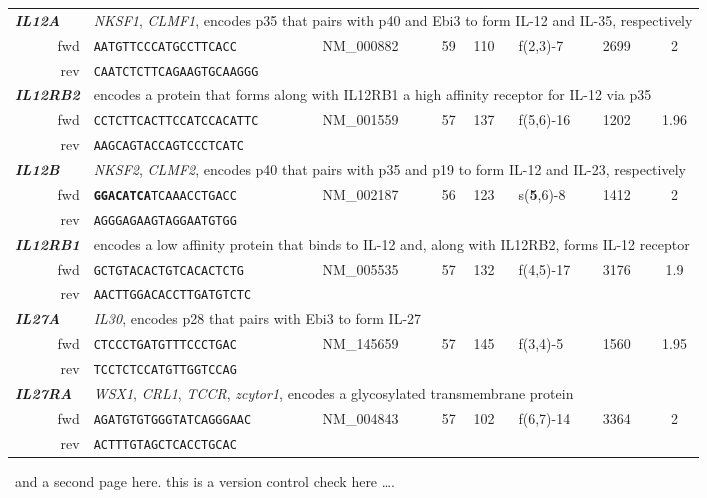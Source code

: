 \documentclass[12pt]{scrreprt} %
\begin{document}
\begin{table}[htbp]
{\begin{tabular}{rllclllc}
\hline \multicolumn{1}{l}{\textit{\textbf{IL12A}}} & \multicolumn{7}{l}{\textit{NKSF1}, \textit{CLMF1}, encodes p35 that pairs with p40 and Ebi3 to form IL-12 and IL-35, respectively} \\ 
\ fwd & \texttt{AATGTTCCCATGCCTTCACC} & NM\_000882 & 59 & 110 & f(2,3)-7 & 2699 & 2 \\ 
\ rev & \texttt{CAATCTCTTCAGAAGTGCAAGGG} &  &  &  &  &  &  \\ 
\hline \multicolumn{1}{l}{\textit{\textbf{IL12RB2}}} & \multicolumn{7}{l}{encodes a protein that forms along with IL12RB1 a high affinity receptor for IL-12 via p35} \\ 
\ fwd & \texttt{CCTCTTCACTTCCATCCACATTC} & NM\_001559 & 57 & 137 & f(5,6)-16 & 1202 & 1.96 \\ 
\ rev & \texttt{AAGCAGTACCAGTCCCTCATC} &  &  &  &  &  &  \\ 
\hline \multicolumn{1}{l}{\textit{\textbf{IL12B}}} & \multicolumn{7}{l}{\textit{NKSF2}, \textit{CLMF2}, encodes p40 that pairs with p35 and p19 to form IL-12 and IL-23, respectively} \\ 
\ fwd & \texttt{\textbf{GGACATCA}TCAAACCTGACC} & NM\_002187 & 56 & 123 & s(\textbf{5},6)-8 & 1412 & 2 \\ 
\ rev & \texttt{AGGGAGAAGTAGGAATGTGG} &  &  &  &  &  &  \\ 
\hline \multicolumn{1}{l}{\textit{\textbf{IL12RB1}}} & \multicolumn{7}{l}{encodes a low affinity protein that binds to IL-12 and, along with IL12RB2, forms IL-12 receptor} \\ 
\ fwd & \texttt{GCTGTACACTGTCACACTCTG} & NM\_005535 & 57 & 132 & f(4,5)-17 & 3176 & 1.9 \\ 
\ rev & \texttt{AACTTGGACACCTTGATGTCTC} &  &  &  &  &  &  \\ 
\hline \multicolumn{1}{l}{\textit{\textbf{IL27A}}} & \multicolumn{7}{l}{\textit{IL30}, encodes p28 that pairs with Ebi3 to form IL-27} \\ 
\ fwd & \texttt{CTCCCTGATGTTTCCCTGAC} & NM\_145659 & 57 & 145 & f(3,4)-5 & 1560 & 1.95 \\ 
\ rev & \texttt{TCCTCTCCATGTTGGTCCAG} &  &  &  &  &  &  \\ 
\hline \multicolumn{1}{l}{\textit{\textbf{IL27RA}}} & \multicolumn{7}{l}{\textit{WSX1}, \textit{CRL1}, \textit{TCCR}, \textit{zcytor1}, encodes a glycosylated transmembrane protein} \\ 
\ fwd & \texttt{AGATGTGTGGGTATCAGGGAAC} & NM\_004843 & 57 & 102 & f(6,7)-14 & 3364 & 2 \\ 
\ rev & \texttt{ACTTTGTAGCTCACCTGCAC} &  &  &  &  &  &  \\ 
\bottomrule
\end{tabular} }
\end{table}
\newpage
\ and a second page here. this is a version control check here \ldots.
\end{document}
